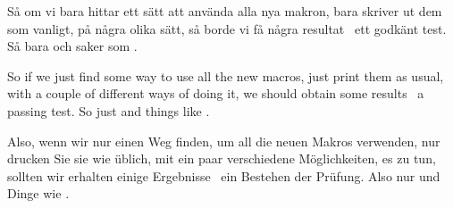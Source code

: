 \documentclass{../skrapport}
\begin{document}
	\begin{otherlanguage}{swedish}
		Så om vi bara hittar ett sätt att använda alla nya makron, \eg
		bara skriver ut dem som vanligt, på några olika sätt, så borde
		vi få några resultat \ie\ ett godkänt test. Så bara \cf \etc och
		saker som \viz.
	\end{otherlanguage}

	\begin{otherlanguage}{british}
		So if we just find some way to use all the new macros, \eg just
		print them as usual, with a couple of different ways of doing it,
		we should obtain some results \ie\ a passing test. So just \cf
		\etc and things like \viz.
	\end{otherlanguage}

	\begin{otherlanguage}{ngerman}
		Also, wenn wir nur einen Weg finden, um all die neuen Makros 
		verwenden, \eg nur drucken Sie sie wie üblich, mit ein paar
		verschiedene Möglichkeiten, es zu tun, sollten wir erhalten einige
		Ergebnisse \ie\ ein Bestehen der Prüfung. Also nur \cf \etc
		und Dinge wie \viz.
	\end{otherlanguage}
\end{document}
